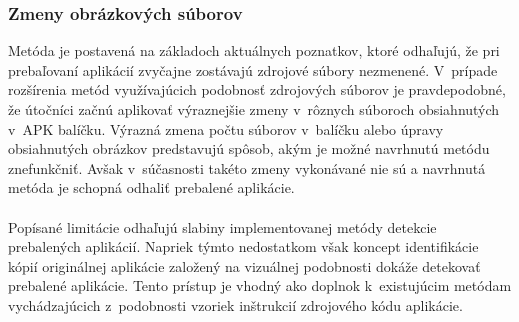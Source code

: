 \subsubsection{\textbf{Zmeny obrázkových súborov}}
Metóda je postavená na základoch aktuálnych poznatkov, ktoré odhaľujú, že pri prebaľovaní aplikácií zvyčajne zostávajú zdrojové súbory nezmenené. V~prípade rozšírenia metód využívajúcich podobnosť zdrojových súborov je pravdepodobné, že útočníci začnú aplikovať výraznejšie zmeny v~rôznych súboroch obsiahnutých v~APK balíčku. Výrazná zmena počtu súborov v~balíčku alebo úpravy obsiahnutých obrázkov predstavujú spôsob, akým je možné navrhnutú metódu znefunkčniť. Avšak v~súčasnosti takéto zmeny vykonávané nie sú a navrhnutá metóda je schopná odhaliť prebalené aplikácie.
\\
\\
Popísané limitácie odhaľujú slabiny implementovanej metódy detekcie prebalených aplikácií. Napriek týmto nedostatkom však koncept identifikácie kópií originálnej aplikácie založený na vizuálnej podobnosti dokáže detekovať prebalené aplikácie. Tento prístup je vhodný ako doplnok k~existujúcim metódam vychádzajúcich z~podobnosti vzoriek inštrukcií zdrojového kódu aplikácie.


